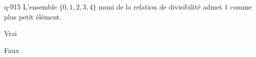 \begin{truefalse}{q-915}
L'ensemble $\{0,1,2,3,4\}$ muni de la relation de divisibilité admet $1$ comme plus petit élément.
\item* Vrai
\item Faux
\end{truefalse}

